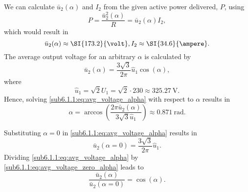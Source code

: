     \begin{solutionblock}
        We can calculate $\bar{u}_\mathrm{2}(\alpha)$ and $I_\mathrm{2}$ from the given active power delivered, $P$, using
        \begin{equation} 
            P = \frac{\bar{u}^2_\mathrm{2}(\alpha)}{R} = \bar{u}_\mathrm{2}(\alpha) I_\mathrm{2},
            \label{sub6.1.1:eq:Active_power_formula}
        \end{equation}
    which would result in 
        \begin{equation}
            \bar{u}_\mathrm{2}(\alpha) \approx \SI{173.2}{\volt},\\
            I_\mathrm{2} \approx \SI{34.6}{\ampere}.
        \end{equation}
        The average output voltage for an arbitrary $\alpha$ is calculated by
        \begin{equation}
            \bar{u}_\mathrm{2}(\alpha) = \frac{3\sqrt{3}}{2\pi}\hat{u}_\mathrm{1}\cos(\alpha),
            \label{sub6.1.1:eq:avg_voltage_alpha}
        \end{equation}
        where
        \begin{equation}
            \hat{u}_\mathrm{1} = \sqrt{2}U_\mathrm{1} = \sqrt{2} \cdot 230 \approx \SI{325.27}{\volt}.
            \label{sub6.1.1:eq:voltage_amplitude}
    \end{equation}
    Hence, 
    solving \eqref{sub6.1.1:eq:avg_voltage_alpha} with respect to $\alpha$ results in
        \begin{equation}
            \alpha = \arccos\left(\frac{ 2\pi\bar{u}_\mathrm{2}(\alpha)}{3\sqrt{3}\hat{u}_\mathrm{1}}\right) \approx \SI{0.871}{\radian}.
            \label{sub6.1.1:eq:calculate_alpha}
        \end{equation}    
    
    \end{solutionblock}
    \begin{solutionblock}
        Substituting $\alpha = 0$ in \eqref{sub6.1.1:eq:avg_voltage_alpha} results in
        \begin{equation}
            \bar{u}_\mathrm{2}(\alpha=0) = \frac{3\sqrt{3}}{2\pi}\hat{u}_\mathrm{1}.
            \label{sub6.1.1:eq:avg_voltage_zero_alpha}
        \end{equation}
        Dividing \eqref{sub6.1.1:eq:avg_voltage_alpha} by \eqref{sub6.1.1:eq:avg_voltage_zero_alpha} leads to  
        \begin{equation}
            \frac{ \bar{u}_\mathrm{2}(\alpha)}{\bar{u}_\mathrm{2}(\alpha=0)} = \cos(\alpha).
            \label{sub6.1.1:eq:voltages_relation}
        \end{equation}    
        
    \end{solutionblock}
